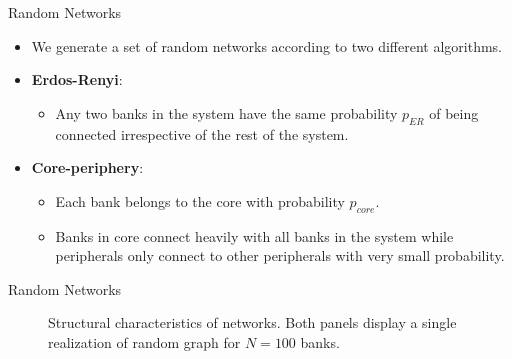 \documentclass{beamer}
\begin{document}
\begin{frame}{Random Networks}
\begin{itemize}
	\item We generate a set of random networks according to two different algorithms.
	\item \textbf{Erdos-Renyi}:
	\begin{itemize}
	\item Any two banks in the system have the same probability $p_{ER}$ of being connected irrespective of the rest of the system.
	\end{itemize}
	\item \textbf{Core-periphery}:
	\begin{itemize}
	\item Each bank belongs to the core with probability $p_{core}$.
	\item Banks in core connect heavily with all banks in the system while peripherals only connect to other peripherals with very small probability.
	\end{itemize}
\end{itemize}
\end{frame}

\begin{frame}{Random Networks}
\begin{figure}[ht!]
	\centering
	\hspace{0.05\linewidth}
	\caption{Structural characteristics of networks. Both panels display a single realization of random graph for $N=100$ banks.}
	\label{fig:TheModel:NetworkExamples} %
\end{figure}
\end{frame}
\end{document}
